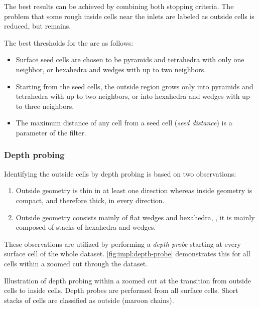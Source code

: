 The best results can be achieved by combining both stopping criteria. The problem that some rough inside cells near the inlets are labeled as outside cells is reduced, but remains.

The best thresholds for the \toyotadataset are as follows:

\begin{itemize}
%
  \item Surface seed cells are chosen to be pyramids and tetrahedra with only one neighbor, or  hexahedra and wedges with up to two neighbors.
%
  \item Starting from the seed cells, the outside region grows only into pyramids and tetrahedra with up to two neighbors, or into hexahedra and wedges with up to three neighbors.
%
  \item The maximum distance of any cell from a seed cell (\emph{seed distance}) is a parameter of the filter.
%
\end{itemize}


\subsubsection{Depth probing}
\label{sec:impl:depth-probing}

Identifying the outside cells by depth probing is based on two observations:
\begin{enumerate}
%
  \item Outside geometry is thin in at least one direction whereas inside geometry is compact, and therefore thick, in every direction.
%
  \item Outside geometry consists mainly of flat wedges and hexahedra, \ie, it is mainly composed of stacks of hexahedra and wedges.
%
\end{enumerate}


These observations are utilized by performing a \emph{depth probe} starting at every surface cell of the whole dataset. \autoref{fig:impl:depth-probe} demonstrates this for all cells within a zoomed cut through the dataset.

{Illustration of depth probing within a zoomed cut at the transition from outside cells to inside cells. Depth probes are performed from all surface cells. Short stacks of cells are classified as outside (maroon chains).}

